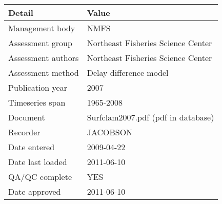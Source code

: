 \begin{table}[htb]
\centering
\begin{tabular}{lp{7cm}}
\toprule
Detail & Value \\
\midrule
Management body    & NMFS                               \\
Assessment group   & Northeast Fisheries Science Center \\
Assessment authors & Northeast Fisheries Science Center \\
Assessment method  & Delay difference model             \\
Publication year   & 2007                               \\
Timeseries span    & 1965-2008                          \\
Document           & Surfclam2007.pdf (pdf in database) \\
Recorder           & JACOBSON                           \\
Date entered       & 2009-04-22                         \\
Date last loaded   & 2011-06-10                         \\
QA/QC complete     & YES                                \\
Date approved      & 2011-06-10                         \\
\bottomrule
\end{tabular}
\label{tab:assessdet}
\end{table}

